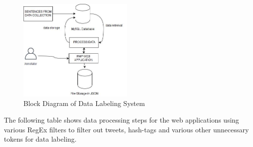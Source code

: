        \begin{figure}[hbt!]
            \centering
                \includegraphics[width=0.5\textwidth]{./img/6.24.jpg}
                \caption{Block Diagram of Data Labeling System}
        \end{figure}
The following table shows data processing steps for the web applications using various
RegEx filters to filter out tweets, hash-tags and various other unnecessary tokens for
data labeling.

